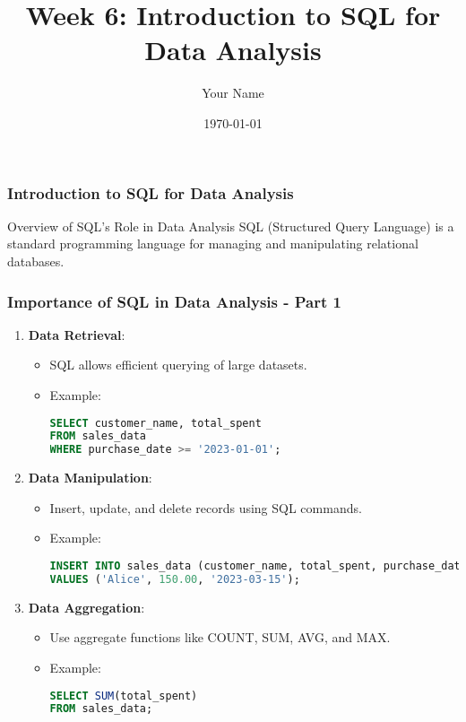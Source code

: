 \documentclass{beamer}
\title{Week 6: Introduction to SQL for Data Analysis}
\author{Your Name}
\institute{Your Institution}
\date{\today}
\begin{document}
\frame{\titlepage}

\begin{frame}[fragile]
    \frametitle{Introduction to SQL for Data Analysis}
    \begin{block}{Overview of SQL's Role in Data Analysis}
        SQL (Structured Query Language) is a standard programming language for managing and manipulating relational databases.
    \end{block}
\end{frame}

\begin{frame}[fragile]
    \frametitle{Importance of SQL in Data Analysis - Part 1}
    \begin{enumerate}
        \item \textbf{Data Retrieval}:
        \begin{itemize}
            \item SQL allows efficient querying of large datasets.
            \item Example:
            \begin{lstlisting}[language=SQL]
SELECT customer_name, total_spent 
FROM sales_data 
WHERE purchase_date >= '2023-01-01';
            \end{lstlisting}
        \end{itemize}

        \item \textbf{Data Manipulation}:
        \begin{itemize}
            \item Insert, update, and delete records using SQL commands.
            \item Example:
            \begin{lstlisting}[language=SQL]
INSERT INTO sales_data (customer_name, total_spent, purchase_date) 
VALUES ('Alice', 150.00, '2023-03-15');
            \end{lstlisting}
        \end{itemize}
        
        \item \textbf{Data Aggregation}:
        \begin{itemize}
            \item Use aggregate functions like COUNT, SUM, AVG, and MAX.
            \item Example:
            \begin{lstlisting}[language=SQL]
SELECT SUM(total_spent) 
FROM sales_data;
            \end{lstlisting}
        \end{itemize}
    \end{enumerate}
\end{frame}
\end{document}

